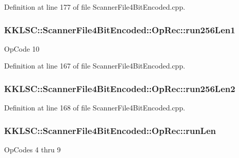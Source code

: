 Definition at line 177 of file Scanner\+File4\+Bit\+Encoded.\+cpp.

\subsubsection[{\texorpdfstring{run256\+Len1}{run256Len1}}]{ K\+K\+L\+S\+C\+::\+Scanner\+File4\+Bit\+Encoded\+::\+Op\+Rec\+::run256\+Len1}\hypertarget{union_scanner_file4_bit_encoded_1_1_op_rec_ad03651ffff11a7287da647531ccf9eda}{}\label{union_scanner_file4_bit_encoded_1_1_op_rec_ad03651ffff11a7287da647531ccf9eda}
Op\+Code 10 

Definition at line 167 of file Scanner\+File4\+Bit\+Encoded.\+cpp.

\subsubsection[{\texorpdfstring{run256\+Len2}{run256Len2}}]{ K\+K\+L\+S\+C\+::\+Scanner\+File4\+Bit\+Encoded\+::\+Op\+Rec\+::run256\+Len2}\hypertarget{union_scanner_file4_bit_encoded_1_1_op_rec_a1b00fe943364fa57541dc23b9fcf7371}{}\label{union_scanner_file4_bit_encoded_1_1_op_rec_a1b00fe943364fa57541dc23b9fcf7371}


Definition at line 168 of file Scanner\+File4\+Bit\+Encoded.\+cpp.

\subsubsection[{\texorpdfstring{run\+Len}{runLen}}]{ K\+K\+L\+S\+C\+::\+Scanner\+File4\+Bit\+Encoded\+::\+Op\+Rec\+::run\+Len}\hypertarget{union_scanner_file4_bit_encoded_1_1_op_rec_a6de141d96861472fb22626dce3f35dd7}{}\label{union_scanner_file4_bit_encoded_1_1_op_rec_a6de141d96861472fb22626dce3f35dd7}
Op\+Codes 4 thru 9 

